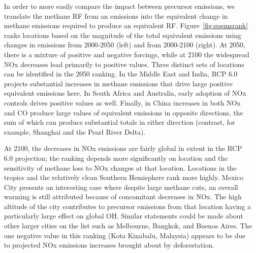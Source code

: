 In order to more easily compare the impact between precursor emissions, we translate the methane RF from an emissions into the equivalent change in methane emissions required to produce an equivalent RF. Figure~\ref{fig:eqemsrank} ranks locations based on the magnitude of the total equivalent emissions using changes in emissions from 2000-2050 (left) and from 2000-2100 (right). At 2050, there is a mixture of positive and negative forcings, while at 2100 the widespread NOx decreases lead primarily to positive values. Three distinct sets of locations can be identified in the 2050 ranking. In the Middle East and India, RCP 6.0 projects substantial increases in methane emissions that drive large positive equivalent emissions here. In South Africa and Australia, early adoption of NOx controls drives positive values as well. Finally, in China increases in both NOx and CO produce large values of equivalent emissions in opposite directions, the sum of which can produce substantial totals in either direction (contrast, for example, Shanghai and the Pearl River Delta).

At 2100, the decreases in NOx emissions are fairly global in extent in the RCP 6.0 projection; the ranking depends more significantly on location and the sensitivity of methane loss to NOx changes at that location. Locations in the tropics and the relatively clean Southern Hemisphere rank more highly. Mexico City presents an interesting case where despite large methane cuts, an overall warming is still attributed because of concomitant decreases in NOx. The high altitude of the city contributes to precursor emissions from that location having a particularly large effect on global OH. Similar statements could be made about other larger cities on the list such as Melbourne, Bangkok, and Buenos Aires. The one negative value in this ranking (Kota Kinabalu, Malaysia) appears to be due to projected NOx emissions increases brought about by deforestation.